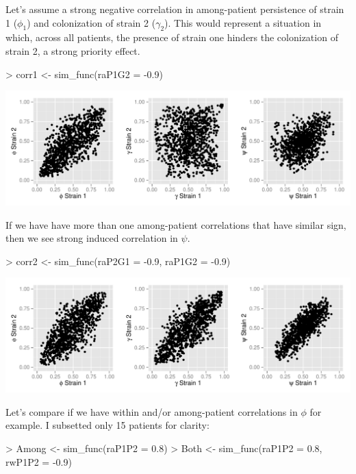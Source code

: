 \documentclass{article}
\begin{document}
Let's assume a strong negative correlation in among-patient persistence of strain 1 ($\phi_1$) and colonization of strain 2 ($\gamma_2$). This would represent a situation in which, across all patients, the presence of strain one hinders the colonization of strain 2, a strong priority effect. 
\begin{Schunk}
\begin{Sinput}
> corr1 <- sim_func(raP1G2 = -0.9)
\end{Sinput}
\end{Schunk}

\begin{center}
\includegraphics{ReadMe-004}
\end{center}

If we have have more than one among-patient correlations that have similar sign, then we see strong induced correlation in $\psi$.

\begin{Schunk}
\begin{Sinput}
> corr2 <- sim_func(raP2G1 = -0.9, raP1G2 = -0.9)
\end{Sinput}
\end{Schunk}

\begin{center}
\includegraphics{ReadMe-006}
\end{center}

Let's compare if we have within and/or among-patient correlations in $\phi$ for example. I subsetted only 15 patients for clarity:

\begin{Schunk}
\begin{Sinput}
> Among <- sim_func(raP1P2 = 0.8)
> Both <- sim_func(raP1P2 = 0.8, rwP1P2 = -0.9)
\end{Sinput}
\end{Schunk}
\end{document}
